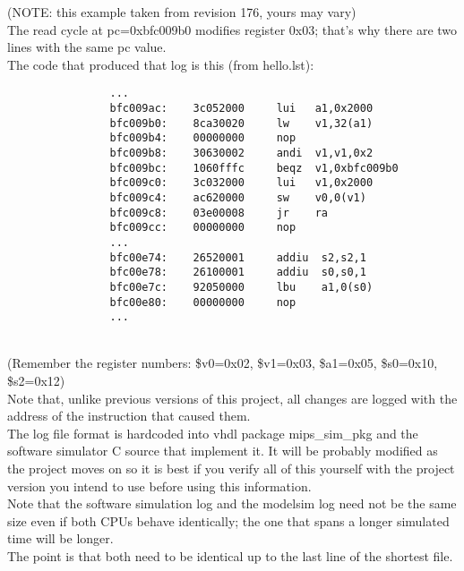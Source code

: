     (NOTE: this example taken from revision 176, yours may vary)\\

    The read cycle at pc=0xbfc009b0 modifies register 0x03; that's why there 
    are two lines with the same pc value.\\

    The code that produced that log is this (from hello.lst):

                \begin{verbatim}
                ...
                bfc009ac:    3c052000     lui   a1,0x2000
                bfc009b0:    8ca30020     lw    v1,32(a1)
                bfc009b4:    00000000     nop
                bfc009b8:    30630002     andi  v1,v1,0x2
                bfc009bc:    1060fffc     beqz  v1,0xbfc009b0
                bfc009c0:    3c032000     lui   v1,0x2000
                bfc009c4:    ac620000     sw    v0,0(v1)
                bfc009c8:    03e00008     jr    ra
                bfc009cc:    00000000     nop
                ...
                bfc00e74:    26520001     addiu  s2,s2,1
                bfc00e78:    26100001     addiu  s0,s0,1
                bfc00e7c:    92050000     lbu    a1,0(s0)
                bfc00e80:    00000000     nop
                ...
                \end{verbatim}\\

    (Remember the register numbers: \$v0=0x02, \$v1=0x03, \$a1=0x05, \$s0=0x10, 
    \$s2=0x12)\\

    Note that, unlike previous versions of this project, all changes are logged
    with the address of the instruction that caused them.\\

    The log file format is hardcoded into vhdl package mips\_sim\_pkg
    and the software simulator C source that implement it. It will
    be probably modified as the project moves on so it is best if you verify
    all of this yourself with the project version you intend to use before 
    using this information.\\

    Note that the software simulation log and the modelsim log need not be the
    same size even if both CPUs behave identically; the one that spans a longer 
    simulated time will be longer.\\
    The point is that both need to be identical up to the last line of the
    shortest file.\\
    

